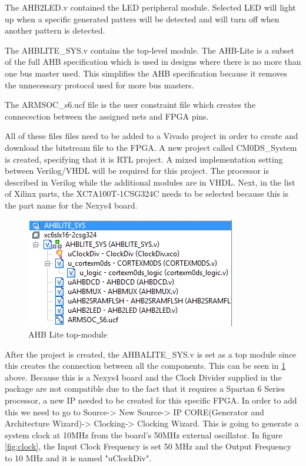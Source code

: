 The AHB2LED.v contained the LED peripheral module. Selected LED will light up when a specific generated patters will be detected and will turn off when another pattern is detected.

The AHBLITE\_SYS.v contains the top-level module. The AHB-Lite is a subset of the full AHB specification which is used in designs where there is no more than one bus master used. This simplifies the AHB specification because it removes the unnecessary protocol used for more bus masters.

The ARMSOC\_s6.ucf file is the user constraint file which creates the connecection between the assigned nets and FPGA pins.

All of these files files need to be added to a Vivado project in order to create and download the bitstream file to the FPGA. A new project called CM0DS\_System is created, specifying that it is RTL project. A mixed implementation setting between Verilog/VHDL will be required for this project. The processor is described in Verilog while the additional modules are in VHDL. Next, in the list of Xilinx parts, the XC7A100T-1CSG324C needs to be selected because this is the part name for the Nexys4 board. 
\begin{figure}
\centering
\includegraphics[scale=0.7]{figures/AHBLITE_SYS_modules_ISE_schematic.PNG}
\caption{AHB Lite top-module } 
\label{fig:ahblite_sys}
\end{figure}
After the project is created, the AHBALITE\_SYS.v is set as a top module since this creates the connection between all the components. This can be seen in \ref{fig:ahblite_sys} above. Because this is a Nexys4 board and the Clock Divider supplied in the package are not compatible due to the fact that it requires a Spartan 6 Series processor, a new IP needed to be created for this specific FPGA. In order to add this we need to go to Source-> New Source-> IP CORE(Generator and Architecture Wizard)-> Clocking-> Clocking Wizard. This is going to generate a system clock at 10MHz from the board's 50MHz external oscillator. In figure \ref{fig:clock}, the Input Clock Frequency is set 50 MHz and the Output Frequency to 10 MHz and it is named "uClockDiv".
